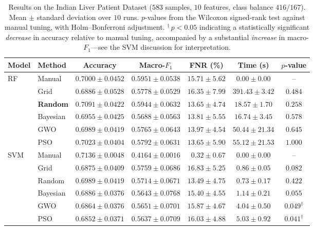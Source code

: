 \documentclass[letterpaper, 10 pt, conference]{ieeeconf}
\begin{document}
\begin{table}[t]
	\caption{Results on the Indian Liver Patient Dataset ($583$ samples, $10$ features, class balance $416/167$). Mean $\pm$ standard deviation over $10$ runs. $p$-values from the Wilcoxon signed-rank test against manual tuning, with Holm--Bonferroni adjustment. $^{\dagger}\,p < 0.05$ indicating a statistically significant \emph{decrease} in accuracy relative to manual tuning, accompanied by a substantial \emph{increase} in macro-$F_1$---see the SVM discussion for interpretation.}
	\label{tab:ilpd_results}
	\centering
	\scriptsize
	\begin{tabular}{|l|l|c|c|c|c|c|}
		\hline
		\textbf{Model} & \textbf{Method} & \textbf{Accuracy} & \textbf{Macro-$F_1$} & \textbf{FNR (\%)} & \textbf{Time (s)} & \textbf{$p$-value} \\
		\hline
		\multirow{6}{*}{RF}
		& Manual   & $0.7000 \pm 0.0452$ & $0.5951 \pm 0.0538$ & $15.71 \pm 5.62$ & $0.00 \pm 0.00$ & -- \\
		& Grid     & $0.6886 \pm 0.0528$ & $0.5778 \pm 0.0529$ & $16.35 \pm 7.99$ & $391.43 \pm 3.42$ & $0.484$ \\
		& \textbf{Random}   & $\mathbf{0.7091 \pm 0.0422}$ & $0.5944 \pm 0.0632$ & $\mathbf{13.65 \pm 4.74}$ & $18.57 \pm 1.70$ & $0.258$ \\
		& Bayesian & $0.6955 \pm 0.0425$ & $0.5688 \pm 0.0563$ & $13.81 \pm 5.55$ & $16.74 \pm 3.45$ & $0.578$ \\
		& GWO      & $0.6989 \pm 0.0419$ & $0.5765 \pm 0.0643$ & $13.97 \pm 4.54$ & $50.44 \pm 21.34$ & $0.645$ \\
		& PSO      & $0.7023 \pm 0.0404$ & $0.5792 \pm 0.0631$ & $13.65 \pm 5.90$ & $55.12 \pm 21.53$ & $1.000$ \\
		\hline
		\multirow{6}{*}{SVM}
		& Manual   & $0.7136 \pm 0.0048$ & $0.4164 \pm 0.0016$ & $\phantom{0}0.32 \pm 0.67$ & $0.00 \pm 0.00$ & -- \\
		& Grid     & $0.6875 \pm 0.0409$ & $\mathbf{0.5759 \pm 0.0686}$ & $16.83 \pm 5.25$ & $0.86 \pm 0.05$ & $0.082$ \\
		& Random   & $0.6989 \pm 0.0419$ & $0.5714 \pm 0.0671$ & $13.49 \pm 4.75$ & $0.73 \pm 0.17$ & $0.422$ \\
		& Bayesian & $0.6886 \pm 0.0376$ & $0.5643 \pm 0.0768$ & $15.40 \pm 4.55$ & $1.14 \pm 0.21$ & $0.055$ \\
		& GWO      & $0.6864 \pm 0.0376$ & $0.5651 \pm 0.0701$ & $15.87 \pm 4.67$ & $4.04 \pm 0.50$ & $0.049^{\dagger}$ \\
		& PSO      & $0.6852 \pm 0.0371$ & $0.5637 \pm 0.0709$ & $16.03 \pm 4.88$ & $5.03 \pm 0.92$ & $0.041^{\dagger}$ \\

\end{tabular}
\end{table}
\end{document}
